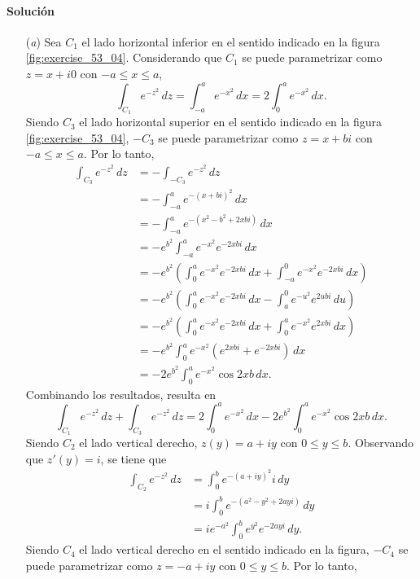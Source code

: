 \documentclass[a4paper]{report}
\begin{document}
\paragraph{Solución}

\begin{enumerate}
 \item[(\textit{a})] Sea \(C_1\) el lado horizontal inferior en el sentido indicado en la figura \ref{fig:exercise_53_04}. Considerando que \(C_1\) se puede parametrizar como \(z=x+i0\) con \(-a\leq x\leq a\),
 \[
  \int_{C_1}e^{-z^2}\,dz=\int_{-a}^a e^{-x^2}\,dx=2\int_0^ae^{-x^2}\,dx.
 \]
 Siendo \(C_3\) el lado horizontal superior en el sentido indicado en la figura \ref{fig:exercise_53_04}, \(-C_3\) se puede parametrizar como \(z=x+bi\)  con \(-a\leq x\leq a\). Por lo tanto,
 \begin{align*}
   \int_{C_3}e^{-z^2}\,dz&=-\int_{-C_3}e^{-z^2}\,dz\\
    &=-\int_{-a}^a e^{-(x+bi)^2}\,dx\\
    &=-\int_{-a}^a e^{-(x^2-b^2+2xbi)}\,dx\\
    &=-e^{b^2}\int_{-a}^a e^{-x^2}e^{-2xbi}\,dx\\
    &=-e^{b^2}\left(\int_0^a e^{-x^2}e^{-2xbi}\,dx+\int_{-a}^0 e^{-x^2}e^{-2xbi}\,dx\right)\\
    &=-e^{b^2}\left(\int_0^a e^{-x^2}e^{-2xbi}\,dx-\int_{a}^0 e^{-u^2}e^{2ubi}\,du\right)\\
    &=-e^{b^2}\left(\int_0^a e^{-x^2}e^{-2xbi}\,dx+\int_0^a e^{-x^2}e^{2xbi}\,dx\right)\\
    &=-e^{b^2}\int_0^a e^{-x^2}\left(e^{2xbi}+e^{-2xbi}\right)\,dx\\
    &=-2e^{b^2}\int_0^a e^{-x^2}\cos 2xb\,dx.
 \end{align*}
 Combinando los resultados, resulta en
 \[
  \int_{C_1}e^{-z^2}\,dz+\int_{C_3}e^{-z^2}\,dz=2\int_0^ae^{-x^2}\,dx-2e^{b^2}\int_0^a e^{-x^2}\cos 2xb\,dx.
 \]
 Siendo \(C_2\) el lado vertical derecho, \(z(y)=a+iy\) con \(0\leq y\leq b\). Observando que \(z'(y)=i\), se tiene que 
 \begin{align*}
  \int_{C_2}e^{-z^2}\,dz&=\int_0^b e^{-(a+iy)^2}i\,dy\\
    &=i\int_0^b e^{-(a^2-y^2+2ayi)}\,dy\\
    &=ie^{-a^2}\int_0^b e^{y^2}e^{-2ayi}\,dy.
 \end{align*}
 Siendo \(C_4\) el lado vertical derecho en el sentido indicado en la figura, \(-C_4\) se puede parametrizar como \(z=-a+iy\) con \(0\leq y\leq b\). Por lo tanto,
 \begin{align*}

\end{align*}
\end{enumerate}
\end{document}
